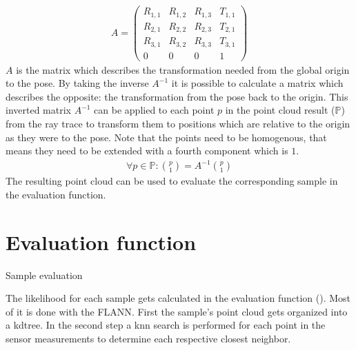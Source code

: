 \documentclass[Thesis.tex]{subfiles}
\begin{document}
\begin{align}
A = \left(\begin{array}{cccc}
      R_{1,1} & R_{1,2} & R_{1,3} & T_{1,1} \\ 
      R_{2,1} & R_{2,2} & R_{2,3} & T_{2,1} \\ 
      R_{3,1} & R_{3,2} & R_{3,3} & T_{3,1} \\
         0    &    0    &    0    &    1
    \end{array}\right)\label{form:affinetransmatrix}
\end{align}
$A$ is the matrix which describes the transformation needed from the global origin to the pose. By taking the inverse $A^{-1}$ it is possible to calculate a matrix which describes the opposite: the transformation from the pose back to the origin. This inverted matrix $A^{-1}$ can be applied to each point $p$ in the point cloud result ($\mathbb{P}$) from the ray trace to transform them to positions which are relative to the origin as they were to the pose. Note that the points need to be homogenous, that means they need to be extended with a fourth component which is $1$.
%
\begin{align}
  \forall p \in \mathbb{P}: \genfrac{(}{)}{0pt}{0}{p}{1} = A^{-1} \genfrac{(}{)}{0pt}{0}{p}{1}
\end{align}
%
The resulting point cloud can be used to evaluate the corresponding sample in the evaluation function.
%
%
%
\section{Evaluation function}
%
\begin{algorithm}[!htp]
\caption{Sample evaluation}
\label{alg:eval}

\end{algorithm}
The likelihood for each sample gets calculated in the evaluation function (). Most of it is done with the \gls{FLANN}. First the sample's point cloud gets organized into a \gls{kdtree}. In the second step a \gls{knn} search is performed for each point in the sensor measurements to determine each respective closest neighbor. 
\end{document}
